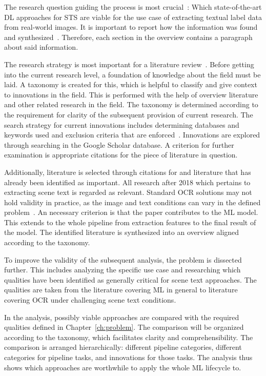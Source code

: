 The research question guiding the process is most crucial~\citep{snyder_literature_2019}:
Which state-of-the-art \ac{DL} approaches for \ac{STS} are viable for the use case of extracting
textual label data from real-world images.
It is important to report how the information was found and
synthesized~\citep{torraco_writing_2005}.
Therefore, each section in the overview contains a paragraph about said information.

The research strategy is most important for a literature
review~\citep{snyder_literature_2019}.
Before getting into the current research level, a foundation of knowledge about the field must be
laid.
A taxonomy is created for this, which is helpful to classify and give context to innovations in the
field.
This is performed with the help of overview literature and other related research in the field.
The taxonomy is determined according to the requirement for clarity of the subsequent provision of
current research.
The search strategy for current innovations includes determining databases and keywords
used and exclusion criteria that are enforced~\citep{torraco_writing_2005}.
Innovations are explored through searching in the Google Scholar database.
A criterion for further examination is appropriate citations for the piece of literature
in question.

Additionally, literature is selected through citations for and literature that has already been
identified as important.
All research after 2018 which pertains to extracting scene text is regarded as relevant.
Standard \ac{OCR} solutions may not hold validity in practice, as the image and text conditions can
vary in the defined problem~\citep{chen_text_2021}.
An necessary criterion is that the paper contributes to the \ac{ML} model.
This extends to the whole pipeline from extraction features to the final result of the model.
The identified literature is synthesized into an overview aligned according to the taxonomy.

To improve the validity of the subsequent analysis, the problem is dissected further.
This includes analyzing the specific use case and researching which qualities have been
identified as generally critical for scene text approaches.
The qualities are taken from the literature covering \ac{ML} in general to literature
covering \ac{OCR} under challenging scene text conditions.

In the analysis, possibly viable approaches are compared with the required qualities defined
in Chapter~\ref{ch:problem}.
The comparison will be organized according to the taxonomy, which facilitates clarity and
comprehensibility.
The comparison is arranged hierarchically: different pipeline categories,
different categories for pipeline tasks, and innovations for those tasks.
The analysis thus shows which approaches are worthwhile to apply the whole \ac{ML} lifecycle to.

